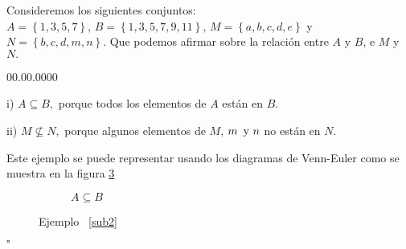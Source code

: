 \begin{ejemplo}\label{sub2}

Consideremos los siguientes conjuntos: $A=\left\{ 1,3,5,7\right\} ,\,B=\left\{ 1,3,5,7,9,11\right\} ,\,M=\left\{ a,b,c,d,e\right\} $
y $N=\left\{ b,c,d,m,n\right\} .$ Que podemos afirmar sobre la relación
entre $A$ y $B$, e $M$ y $N.$ 

\end{ejemplo}

\solu 
\begin{lyxlist}{00.00.0000}
\item [{i)}] $A\subseteq B,$ porque todos los elementos de $A$ están
en $B.$
\item [{ii)}] $M\nsubseteq N,$ porque algunos elementos de $M$, $m\text{\,\ \ensuremath{\mbox{y }}}n$
no están en $N.$
\end{lyxlist}
Este ejemplo se puede representar usando los diagramas de Venn-Euler
como se muestra en la figura \ref{sub}

\begin{figure}[H] 
\centering 
\begin{subfigure}[b]{0.40\textwidth}  
 \centering 
     \caption{$A \subseteq B$} 
     \label{subfig4}   
   \end{subfigure} 
  \begin{subfigure}[b]{0.40\textwidth}
   \centering 
    \label{subfig5}   
     \end{subfigure}       
  \caption{Ejemplo \ \ref{sub2}} 
\label{sub}
  \end{figure}   \hfill $\square$

